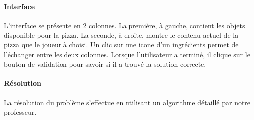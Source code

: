         \paragraph{Interface}
            L'interface se présente en 2 colonnes. La première, à gauche,
            contient les objets disponible pour la pizza. La seconde, à droite,
            montre le contenu actuel de la pizza que le joueur à choisi.
            Un clic sur une icone d'un ingrédients permet de l'échanger entre
            les deux colonnes.
            Lorsque l'utilisateur a terminé, il clique sur le bouton de
            validation pour savoir si il a trouvé la solution correcte.
        \paragraph{Résolution}
            La résolution du problème s'effectue en utilisant un algorithme
            détaillé par notre professeur.
